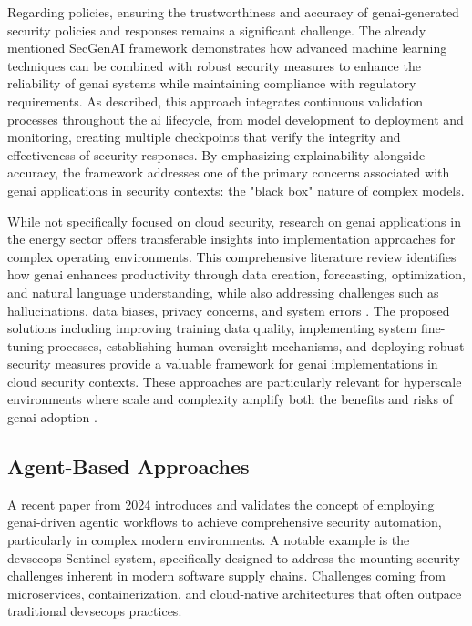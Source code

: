 Regarding policies, ensuring the trustworthiness and accuracy of \gls{genai}-generated security policies and responses remains a significant challenge. The already mentioned SecGenAI framework demonstrates how advanced machine learning techniques can be combined with robust security measures to enhance the reliability of \gls{genai} systems while maintaining compliance with regulatory requirements.\cite{haryanto_secgenai_2024}
As described, this approach integrates continuous validation processes throughout the \gls{ai} lifecycle, from model development to deployment and monitoring, creating multiple checkpoints that verify the integrity and effectiveness of security responses. By emphasizing explainability alongside accuracy, the framework addresses one of the primary concerns associated with \gls{genai} applications in security contexts: the "black box" nature of complex models.\cite{haryanto_secgenai_2024}

While not specifically focused on cloud security, research on \gls{genai} applications in the energy sector offers transferable insights into implementation approaches for complex operating environments. This comprehensive literature review identifies how \gls{genai} enhances productivity through data creation, forecasting, optimization, and natural language understanding, while also addressing challenges such as hallucinations, data biases, privacy concerns, and system errors \cite{surathunmanun_exploring_2024}.
The proposed solutions including improving training data quality, implementing system fine-tuning processes, establishing human oversight mechanisms, and deploying robust security measures provide a valuable framework for \gls{genai} implementations in cloud security contexts. These approaches are particularly relevant for hyperscale environments where scale and complexity amplify both the benefits and risks of \gls{genai} adoption \cite{surathunmanun_exploring_2024}.


\subsection{Agent-Based Approaches} %
\label{sec:Agent-Based Approaches}

A recent paper from 2024 introduces and validates the concept of employing \gls{genai}-driven agentic workflows to achieve comprehensive security automation, particularly in complex modern environments. A notable example is the \gls{devsecops} Sentinel system\cite{pillala_devsecops_2024}, specifically designed to address the mounting security challenges inherent in modern software supply chains. Challenges coming from microservices, containerization, and cloud-native architectures that often outpace traditional \gls{devsecops} practices\cite{pillala_devsecops_2024}.

